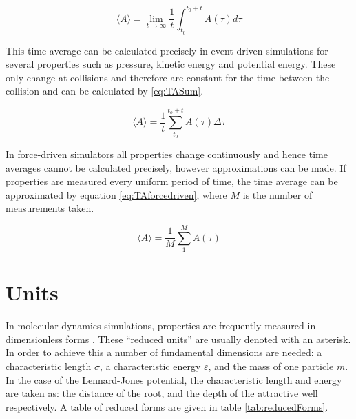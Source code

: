 \documentclass[12pt]{UoAthesis}
\begin{document}
\begin{equation}
  \label{eq:TAdef}
  \langle A \rangle = \lim_{t \to \infty} \frac{1}{t}  \int^{t_0+t}_{t_0}A(\tau) d\tau
\end{equation}

This time average can be calculated precisely in event-driven
simulations for several properties such as pressure, kinetic energy
and potential energy.  These only change at collisions and therefore
are constant for the time between the collision and can be calculated
by \eqref{eq:TASum}.

\begin{equation}
  \label{eq:TASum}
  \langle A \rangle = \frac{1}{t}\sum^{t_o+t}_{t_0}A(\tau)\Delta \tau
\end{equation}

In force-driven simulators all properties change continuously and
hence time averages cannot be calculated precisely, however
approximations can be made. If properties are measured every uniform
period of time, the time average can be approximated by equation
\eqref{eq:TAforcedriven}, where $M$ is the number of measurements
taken.

\begin{equation}
  \label{eq:TAforcedriven}
  \langle A \rangle = \frac{1}{M} \sum^{M}_{1}A(\tau)
\end{equation}
\section{Units}

In molecular dynamics simulations, properties are frequently measured
in dimensionless forms \cite{Haile1997}. These ``reduced units'' are
usually denoted with an asterisk.  In order to achieve this a number
of fundamental dimensions are needed: a characteristic length
$\sigma$, a characteristic energy $\varepsilon$, and the mass of one
particle $m$.  In the case of the Lennard-Jones potential, the
characteristic length and energy are taken as: the distance of the
root, and the depth of the attractive well respectively. A table of
reduced forms are given in table \ref{tab:reducedForms}.
\end{document}
